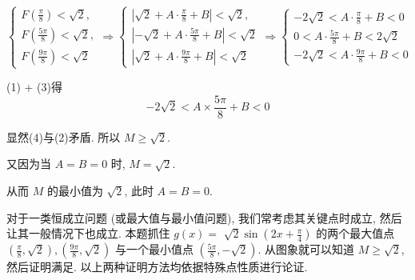 \begin{solution}
	\[
		\left\{\begin{array} { l }
			{ F ( \frac { \pi } { 8 } ) < \sqrt { 2 } , }  \tag{1} \\
			{ F ( \frac { 5 \pi } { 8 } ) < \sqrt { 2 } , }        \\
			{ F ( \frac { 9 \pi } { 8 } ) < \sqrt { 2 } }
		\end{array} \Rightarrow \left\{\begin{array} { l }
			{ | \sqrt { 2 } + A \cdot \frac { \pi } { 8 } + B | < \sqrt { 2 } , }   \\
			{ | - \sqrt { 2 } + A \cdot \frac { 5 \pi } { 8 } + B | < \sqrt { 2 } } \\
			{ | \sqrt { 2 } + A \cdot \frac { 9 \pi } { 8 } + B | < \sqrt { 2 } }
		\end{array} \Rightarrow \left\{\begin{array}{l}
			-2 \sqrt{2}<A \cdot \frac{\pi}{8}+B<0  \\
			0<A \cdot \frac{5 \pi}{8}+B<2 \sqrt{2} \\
			-2 \sqrt{2}<A \cdot \frac{9 \pi}{8}+B<0
		\end{array}\right.\right.\right.
	\]

	(1) + (3)得
	\begin{equation*}
		-2 \sqrt{2}<A \times \frac{5 \pi}{8}+B<0 \tag{4}
	\end{equation*}

	显然(4)与(2)矛盾. 所以 $M \geqslant \sqrt{2}$.

	又因为当 $A=B=0$ 时, $M=\sqrt{2}$.

	从而 $M$ 的最小值为 $\sqrt{2}$, 此时 $A=B=0$.
\end{solution}
\begin{note}
	对于一类恒成立问题 (或最大值与最小值问题), 我们常考虑其关键点时成立, 然后让其一般情况下也成立. 本题抓住 $g(x)=$ $\sqrt{2} \sin \left(2 x+\frac{\pi}{4}\right)$ 的两个最大值点 $\left(\frac{\pi}{8}, \sqrt{2}\right),\left(\frac{9 \pi}{8}, \sqrt{2}\right)$ 与一个最小值点 $\left(\frac{5 \pi}{8},-\sqrt{2}\right)$. 从图象就可以知道 $M \geqslant \sqrt{2}$, 然后证明满足. 以上两种证明方法均依据特殊点性质进行论证.
\end{note}

